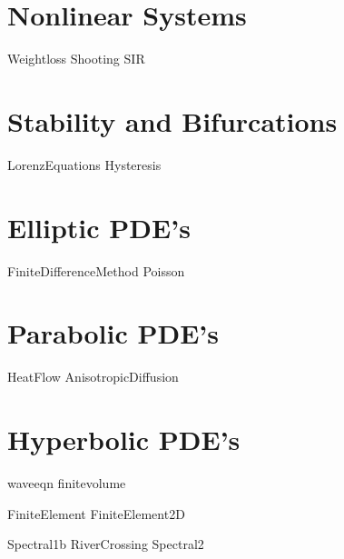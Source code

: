 \documentclass[nociteref]{SIAM-GH-book}
\begin{document}
\part{Nonlinear Systems}
{Weightloss}
{Shooting}
{SIR}


\part{Stability and Bifurcations}
{LorenzEquations}
{Hysteresis}

\part{Elliptic PDE's}
{FiniteDifferenceMethod}
{Poisson}

\part{Parabolic PDE's}
{HeatFlow}
{AnisotropicDiffusion}


\part{Hyperbolic PDE's}
{waveeqn}
{finitevolume}

{FiniteElement}
{FiniteElement2D}

{Spectral1b}
{RiverCrossing}
{Spectral2}

% 
% 
% 
% 
% 
% 
\end{document}
